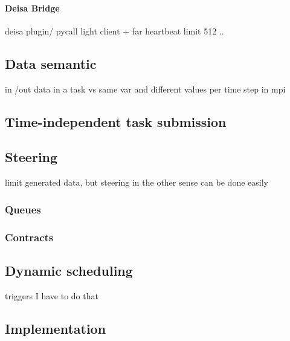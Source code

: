\paragraph{Deisa Bridge}
deisa plugin/ pycall
light client + far heartbeat 
limit 512 ..

\subsection{Data semantic}
in /out  data in a task vs same var and different values per time step in mpi

\subsection{Time-independent task submission}

\subsection{Steering}
limit generated data, but steering in the other sense can be done easily  
\subsubsection{Queues}
\subsubsection{Contracts}
\subsection{Dynamic scheduling}
triggers I have to do that 

\subsection{Implementation}

\cite{deisa}

